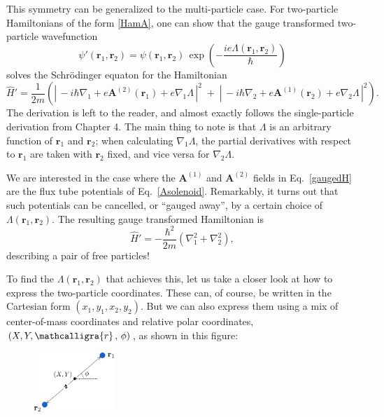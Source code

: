 \documentclass[pra,12pt]{revtex4}
\begin{document}
This symmetry can be generalized to the multi-particle case.  For
two-particle Hamiltonians of the form \eqref{HamA}, one can show that
the gauge transformed two-particle wavefunction
\begin{equation}
  \psi'(\mathbf{r}_1, \mathbf{r}_2) = \psi(\mathbf{r}_1, \mathbf{r}_2)
  \, \exp\!\left(-\frac{ie\Lambda(\mathbf{r}_1, \mathbf{r}_2)}{\hbar}\right)
\end{equation}
solves the Schr\"odinger equaton for the Hamiltonian
\begin{equation}
  \hat{H}' = \frac{1}{2m} \left( \left| \, -i\hbar \nabla_1
  + e\mathbf{A}^{(2)}(\mathbf{r}_1) + e \nabla_1 \Lambda\,\right|^2
  \;+\; \left| \, -i\hbar \nabla_2
  + e\mathbf{A}^{(1)}(\mathbf{r}_2) + e \nabla_2\Lambda\,\right|^2\right).
  \label{gaugedH}
\end{equation}
The derivation is left to the reader, and almost exactly follows the
single-particle derivation from Chapter 4.  The main thing to note is
that $\Lambda$ is an arbitrary function of $\mathbf{r}_1$ and
$\mathbf{r}_2$; when calculating $\nabla_1\Lambda$, the partial
derivatives with respect to $\mathbf{r}_1$ are taken with
$\mathbf{r}_2$ fixed, and vice versa for $\nabla_2\Lambda$.

We are interested in the case where the $\mathbf{A}^{(1)}$ and
$\mathbf{A}^{(2)}$ fields in Eq.~\eqref{gaugedH} are the flux tube
potentials of Eq.~\eqref{Asolenoid}.  Remarkably, it turns out that
such potentials can be cancelled, or ``gauged away'', by a certain
choice of $\Lambda(\mathbf{r}_1, \mathbf{r}_2)$.  The resulting gauge
transformed Hamiltonian is
\begin{equation}
  \hat{H}' = - \frac{\hbar^2}{2m} \left( \nabla_1^2 + \nabla_2^2\right),
  \label{gaugedH2}
\end{equation}
describing a pair of free particles!

\clearpage
To find the $\Lambda(\mathbf{r}_1,\mathbf{r}_2)$ that achieves this,
let us take a closer look at how to express the two-particle
coordinates.  These can, of course, be written in the Cartesian form
$(x_1, y_1, x_2, y_2)$.  But we can also express them using a mix of
center-of-mass coordinates and relative polar coordinates, $(X, Y,
\mathcalligra{r}\,,\, \phi)$, as shown in this figure:

\begin{figure}[h]
  \centering\includegraphics[width=0.27\textwidth]{anyon-coordinates}
\end{figure}
\end{document}

